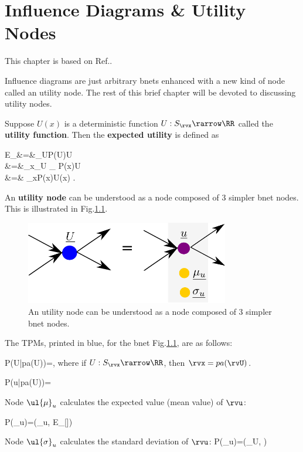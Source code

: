 \chapter{Influence Diagrams \& Utility Nodes}
\label{ch-influ-diag}

This chapter is based on Ref.\cite{sha-influ-diag}.

Influence diagrams are
just arbitrary bnets
enhanced with a 
new kind of node called an utility node.
The rest
of this brief chapter  will 
be devoted to discussing utility nodes.

Suppose $U(x)$ is a deterministic 
function $U:S_\rvx\rarrow \RR$
called the {\bf utility function}.
Then the {\bf expected utility}
is defined as


\beqa
E_\rvU[\rvU]&=&\sum_UP(U)U
\\
&=&\sum_x\sum_U
_
{\delta[U, U(x)]}P(x)U
\\
&=&
\sum_xP(x)U(x)
\;.
\eeqa

An {\bf utility node}
can be
understood
as a node
composed of 3 simpler bnet nodes.
This
is illustrated in Fig.\ref{fig-util-node}.

\begin{figure}[h!]
\centering
\includegraphics[width=3.5in]
{influ-diag/util-node.png}
\caption{An utility node
can be
understood
as a node 
composed of 3 simpler bnet nodes.} 
\label{fig-util-node}
\end{figure}

The TPMs,
printed in blue,
for the bnet Fig.\ref{fig-util-node},
are as follows:

\beq\color{blue}
P(U|pa(U))=\delta[U, U(pa(U))]
\;,
\eeq
where if $U:S_\rvx\rarrow \RR$,
then $\rvx=pa(\rvU)$.

\beq\color{blue}
P(u|pa(U))=
\delta[u, U(pa(U))]
\eeq

Node $\ul{\mu}_u$
calculates the
expected value (mean value) of $\rvu$:

\beq\color{blue}
P(\mu_u)=\delta(\mu_u,
E_{\rvu}[\rvu])
\eeq

Node $\ul{\sigma}_u$
calculates the
standard deviation of $\rvu$:
\beq\color{blue}
P(\sigma_u)=\delta(\sigma_U,
)
\eeq

